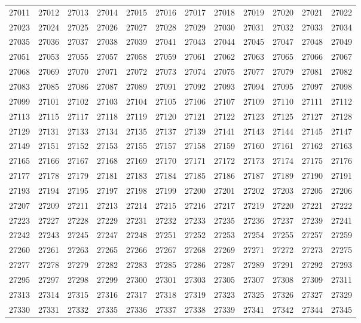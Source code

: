 \begin{center}
\begin{longtable}{llllllllllll}
27011 &27012 &27013 &27014 &27015 &27016 &27017 &27018 &27019 &27020 &27021 &27022 \\
27023 &27024 &27025 &27026 &27027 &27028 &27029 &27030 &27031 &27032 &27033 &27034 \\
27035 &27036 &27037 &27038 &27039 &27041 &27043 &27044 &27045 &27047 &27048 &27049 \\
27051 &27053 &27055 &27057 &27058 &27059 &27061 &27062 &27063 &27065 &27066 &27067 \\
27068 &27069 &27070 &27071 &27072 &27073 &27074 &27075 &27077 &27079 &27081 &27082 \\
27083 &27085 &27086 &27087 &27089 &27091 &27092 &27093 &27094 &27095 &27097 &27098 \\
27099 &27101 &27102 &27103 &27104 &27105 &27106 &27107 &27109 &27110 &27111 &27112 \\
27113 &27115 &27117 &27118 &27119 &27120 &27121 &27122 &27123 &27125 &27127 &27128 \\
27129 &27131 &27133 &27134 &27135 &27137 &27139 &27141 &27143 &27144 &27145 &27147 \\
27149 &27151 &27152 &27153 &27155 &27157 &27158 &27159 &27160 &27161 &27162 &27163 \\
27165 &27166 &27167 &27168 &27169 &27170 &27171 &27172 &27173 &27174 &27175 &27176 \\
27177 &27178 &27179 &27181 &27183 &27184 &27185 &27186 &27187 &27189 &27190 &27191 \\
27193 &27194 &27195 &27197 &27198 &27199 &27200 &27201 &27202 &27203 &27205 &27206 \\
27207 &27209 &27211 &27213 &27214 &27215 &27216 &27217 &27219 &27220 &27221 &27222 \\
27223 &27227 &27228 &27229 &27231 &27232 &27233 &27235 &27236 &27237 &27239 &27241 \\
27242 &27243 &27245 &27247 &27248 &27251 &27252 &27253 &27254 &27255 &27257 &27259 \\
27260 &27261 &27263 &27265 &27266 &27267 &27268 &27269 &27271 &27272 &27273 &27275 \\
27277 &27278 &27279 &27282 &27283 &27285 &27286 &27287 &27289 &27291 &27292 &27293 \\
27295 &27297 &27298 &27299 &27300 &27301 &27303 &27305 &27307 &27308 &27309 &27311 \\
27313 &27314 &27315 &27316 &27317 &27318 &27319 &27323 &27325 &27326 &27327 &27329 \\
27330 &27331 &27332 &27335 &27336 &27337 &27338 &27339 &27341 &27342 &27344 &27345 \\

\end{longtable}
\end{center}
